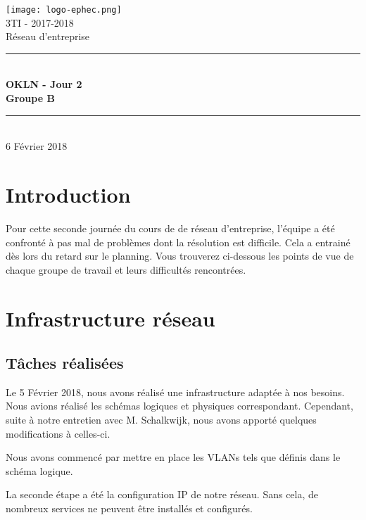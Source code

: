 \documentclass{article}
\begin{document}
\begin{titlepage}
\begin{center}

\texttt{[image: logo-ephec.png]}\\[1cm]
{\large 3TI - 2017-2018}\\[0.5cm]

{\large Réseau d'entreprise}\\[0.8cm]
\newcommand{\HRule}{\rule{\linewidth}{0.5mm}}
\HRule \\[0.7cm]
{\huge \bfseries OKLN - Jour 2\\[0.75cm] }
{\bfseries Groupe B }\\[1cm]
\HRule \\[2.5cm]


6 Février 2018

\end{center}
\end{titlepage}

\section{Introduction}
Pour cette seconde journée du cours de de réseau d'entreprise, l'équipe a été confronté à pas mal de problèmes dont la résolution est difficile. Cela a entrainé dès lors du retard sur le planning. Vous trouverez ci-dessous les points de vue de chaque groupe de travail et leurs difficultés rencontrées. 

\section{Infrastructure réseau}
    \subsection{Tâches réalisées}
        Le 5 Février 2018, nous avons réalisé une infrastructure adaptée à nos besoins. Nous avions réalisé les schémas logiques et physiques correspondant. Cependant, suite à notre entretien avec M. Schalkwijk, nous avons apporté quelques modifications à celles-ci.
        
        Nous avons commencé par mettre en place les VLANs tels que définis dans le schéma logique.
        
        La seconde étape a été la configuration IP de notre réseau. Sans cela, de nombreux services ne peuvent être installés et configurés.
        
\end{document}
